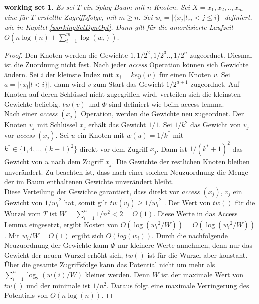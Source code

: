 \documentclass[a4paper,12pt]{article}
\begin{document}
\newtheorem{Satz2}{working set}[section] \label{workingSetSplay}
\begin{Satz2} Es sei $T$ ein Splay Baum mit $n$ Knoten. Sei $X = x_1,x_2,..,x_m$ eine für $T$ erstellte Zugriffsfolge, mit $m \geq n$. Sei ${w_i = \vert\{x_j \vert t_{xi} < j \leq i   \} \vert }$ definiert, wie in Kapitel \ref{workingSetDynOpt}. Dann gilt für die amortisierte Laufzeit \\
	$O\left( n \log\left(n\right) + \sum_{i = 1}^{m} \log\left( w_i\right) \right)$.
\end{Satz2}
\begin{proof}
	Den Knoten werden die Gewichte $1, 1/2^2,1/2^3 .., 1/2^n$ zugeordnet. Diesmal ist die Zuordnung nicht fest. Nach jeder \textit{access} Operation können sich Gewichte ändern. Sei $i$ der kleinste Index mit $x_i = \mathit{key}\left(v\right)$ für einen Knoten $v$. Sei $a = \vert\{x_l \vert l < i\}\vert$, dann wird $v$ zum Start das Gewicht $1 / 2^{a+1}$ zugeordnet. Auf Knoten auf deren Schlüssel nicht zugegriffen wird, verteilen sich die kleinsten Gewichte beliebig. $\mathit{tw}\left(v\right)$ und $\Phi$ sind definiert wie beim access lemma.\\
	Nach einer \textit{access} $\left(x_j\right)$ Operation, werden die Gewichte neu zugeordnet. Der Knoten $v_j$ mit Schlüssel $x_j$ erhält das Gewicht $1/1$. Sei $1/k^2$ das Gewicht von $v_j$ vor \textit{access} $\left(x_j\right)$. Sei $u$ ein Knoten mit $w\left(u\right) = 1 / k^*$ mit  $k^* \in \{1, 4,.., \left(k-1\right)^2\}$ direkt vor dem Zugriff $x_j$. Dann ist $1 /\left(k^* + 1\right)^2$ das Gewicht von $u$ nach dem Zugriff $x_j$. Die Gewichte der restlichen Knoten bleiben unverändert. Zu beachten ist, dass nach einer solchen Neuzuordnung die Menge der im Baum enthaltenen Gewichte unverändert bleibt. \\
	Diese Verteilung der Gewichte garantiert, dass direkt vor  \textit{access} $\left(x_j\right)$, $v_j$ ein Gewicht von ${1 /w_i}^2$ hat, somit gilt $\mathit{tw}\left(v_j\right) \geq {1 /w_i}^2$ . Der Wert von $\mathit{tw}\left(\right)$ für die Wurzel vom $T$ ist $W = \sum_{i = 1}^{n} 1/ n^2 < 2 = O\left(1\right) $. Diese Werte in das Access Lemma eingesetzt, ergibt Kosten von $O\left(\log\left({w_i}^2  / W\right)\right) = O\left(\log\left({w_i}^2 /W  \right)\right)$. Mit $w_i /W = O\left(1\right)$ ergibt sich $O\left(log\left(w_i\right)\right)$. Durch die nachfolgende Neuzuordnung der Gewichte kann $\Phi$ nur kleinere Werte annehmen, denn nur das Gewicht der neuen Wurzel erhöht sich, $\mathit{tw}\left(\right)$ ist für die Wurzel aber konstant.\\
	Über die gesamte Zugriffsfolge kann das Potential nicht um mehr als $\sum_{i = 1}^{n} \log_2\left(w\left(i\right) / W\right)$ kleiner werden. Denn $W$ ist der maximale Wert von $\mathit{tw}\left(\right)$ und  der minimale ist $1 /n^2$. Daraus folgt eine maximale Verringerung des Potentials von $O\left(n \log \left(n\right)\right)$. 
\end{proof}
\end{document}
